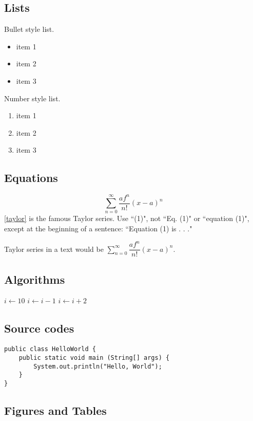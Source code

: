 \documentclass[conference]{IEEEtran}
\begin{document}
\subsection{Lists}
Bullet style list.
\begin{itemize}
    \item item 1
    \item item 2
    \item item 3
\end{itemize}
Number style list.
\begin{enumerate}
    \item item 1
    \item item 2
    \item item 3
\end{enumerate}

\subsection{Equations}
\begin{equation}
    \sum_{n=0}^{\infty} \dfrac{af^{n}}{n!}(x-a)^{n} 
\label{taylor}
\end{equation}
\eqref{taylor} is the famous Taylor series. Use ``(1)", not ``Eq. (1)" or ``equation (1)", except at the beginning of a sentence: ``Equation (1) is . . ."

    Taylor series in a text would be  $\sum_{n=0}^{\infty} \dfrac{af^{n}}{n!}(x-a)^{n}$.

\subsection{Algorithms}
\begin{algorithmic}
\STATE $i \gets 10$
    \STATE $i \gets i-1$
\ELSE 
        \STATE $i \gets i+2$
    \ENDIF
\ENDIF

\end{algorithmic}
\subsection{Source codes}
\begin{verbatim}
public class HelloWorld {
    public static void main (String[] args) {
        System.out.println("Hello, World");
    }
}
\end{verbatim}

\subsection{Figures and Tables}
\end{document}

